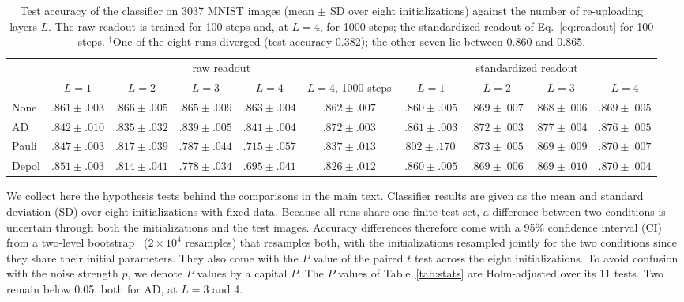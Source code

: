 \documentclass[
 aps,pra,
 twocolumn,
 superscriptaddress,
 longbibliography,
 nofootinbib
]{revtex4-2}
\begin{document}
\begin{table}[t]
\caption{Test accuracy of the classifier on 3037 MNIST images (mean $\pm$ SD
over eight initializations) against the number of re-uploading layers $L$.
The raw readout is trained for 100 steps and, at $L=4$, for 1000 steps; the
standardized readout of Eq.~\eqref{eq:readout} for 100 steps.
$^\dagger$One of the eight runs diverged (test accuracy 0.382); the other seven
lie between 0.860 and 0.865.}
\label{tab:clf}
\begin{ruledtabular}
\begin{tabular}{lccccccccc}
 & \multicolumn{5}{c}{raw readout} & \multicolumn{4}{c}{standardized readout}\\
 & $L=1$ & $L=2$ & $L=3$ & $L=4$ & $L=4$, 1000 steps & $L=1$ & $L=2$ & $L=3$ & $L=4$\\
\colrule
None & $.861\pm.003$ & $.866\pm.005$ & $.865\pm.009$ & $.863\pm.004$ & $.862\pm.007$ & $.860\pm.005$ & $.869\pm.007$ & $.868\pm.006$ & $.869\pm.005$\\
AD & $.842\pm.010$ & $.835\pm.032$ & $.839\pm.005$ & $.841\pm.004$ & $.872\pm.003$ & $.861\pm.003$ & $.872\pm.003$ & $.877\pm.004$ & $.876\pm.005$\\
Pauli & $.847\pm.003$ & $.817\pm.039$ & $.787\pm.044$ & $.715\pm.057$ & $.837\pm.013$ & $.802\pm.170^\dagger$ & $.873\pm.005$ & $.869\pm.009$ & $.870\pm.007$\\
Depol & $.851\pm.003$ & $.814\pm.041$ & $.778\pm.034$ & $.695\pm.041$ & $.826\pm.012$ & $.860\pm.005$ & $.869\pm.006$ & $.869\pm.010$ & $.870\pm.004$\\
\end{tabular}
\end{ruledtabular}
\end{table}

We collect here the hypothesis tests behind the comparisons in the main text.
Classifier results are given as the mean and standard deviation (SD) over
eight initializations with fixed data. Because all runs share one finite test
set, a difference between two conditions is uncertain through both the
initializations and the test images. Accuracy differences therefore come with
a 95\% confidence interval (CI) from a two-level
bootstrap~\cite{efron1994introduction} ($2\times10^4$ resamples) that
resamples both, with the initializations resampled jointly for the two
conditions since they share their initial parameters. They also come with the
$P$ value of the paired $t$ test across the eight initializations. To avoid
confusion with the noise strength $p$, we denote $P$ values by a capital $P$. The $P$ values of
Table~\ref{tab:stats} are Holm-adjusted over its 11 tests. Two remain below
0.05, both for AD, at $L=3$ and 4.
\end{document}
